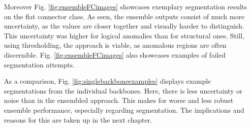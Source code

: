Moreover Fig. \ref{fig:ensembleFCimages} showcases exemplary segmentation results on the flat connector class. As 
seen, the ensemble outputs consist of much more uncertainty, as the values are closer together and visually harder to distinguish. This uncertainty 
was higher for logical anomalies than for structural ones. Still, 
using thresholding, the approach is viable, as anomalous regions are often discernible. Fig. \ref{fig:ensembleFCimages} also showcases examples of failed segmentation 
attempts. 



As a comparison, Fig. \ref{fig:singlebackboneexamples} displays example segmentations from the individual backbones. Here, there is less uncertainty or 
noise than in the ensembled approach. This makes for worse and less robust ensemble performance, especially regarding segmentation. 
The implications and reasons for this are taken up in the next chapter.






